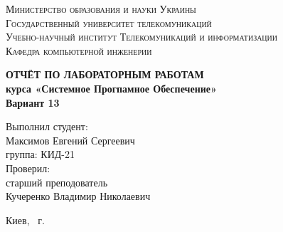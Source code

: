 \documentclass[14pt,a4paper,report]{ncc}
\begin{document}
\renewcommand{\chaptername}{Лабораторная работа}
\def\contentsname{Содержание}

\begin{titlepage}
\begin{center}
\textsc{Министерство образования и науки Украины\\[2mm]
Государственный университет телекомуникаций\\[5mm]
Учебно-научный институт Телекомуникаций и информатизации\\[2mm]
Кафедра компьютерной инженерии}

\vfill

\textbf{ОТЧЁТ ПО ЛАБОРАТОРНЫМ РАБОТАМ\\[3mm]
курса «Системное Прогпамное Обеспечение»\\[6mm]
Вариант 13
\\[20mm]
}
\end{center}

\hfill
\begin{minipage}{.5\textwidth}
Выполнил студент:\\[2mm] 
Максимов Евгений Сергеевич\\
группа: КИД-21\\[5mm]

Проверил:\\[2mm] 
старший преподователь\\
Кучеренко Владимир Николаевич
\end{minipage}%
\vfill
\begin{center}
 Киев, \theyear\ г.
\end{center}
\end{titlepage}

\tableofcontents
\newpage


\end{document}
